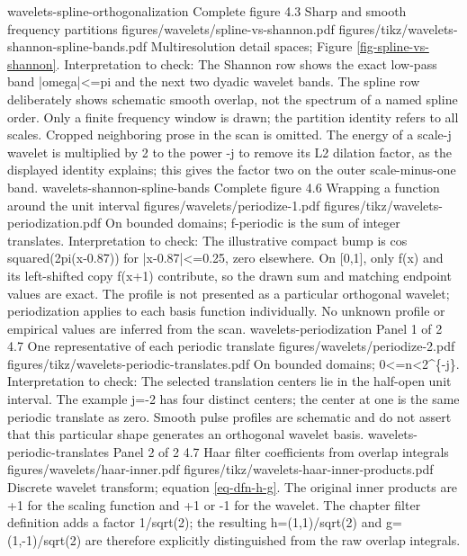 {wavelets-spline-orthogonalization}
{Complete figure}
{4.3}
{Sharp and smooth frequency partitions}
{figures/wavelets/spline-vs-shannon.pdf}
{figures/tikz/wavelets-shannon-spline-bands.pdf}
{Multiresolution detail spaces; Figure \ref{fig-spline-vs-shannon}.}
{Interpretation to check: The Shannon row shows the exact low-pass band |omega|<=pi and the next two dyadic wavelet bands. The spline row deliberately shows schematic smooth overlap, not the spectrum of a named spline order. Only a finite frequency window is drawn; the partition identity refers to all scales. Cropped neighboring prose in the scan is omitted. The energy of a scale-j wavelet is multiplied by 2 to the power -j to remove its L2 dilation factor, as the displayed identity explains; this gives the factor two on the outer scale-minus-one band.}
{wavelets-shannon-spline-bands}
{Complete figure}
{4.6}
{Wrapping a function around the unit interval}
{figures/wavelets/periodize-1.pdf}
{figures/tikz/wavelets-periodization.pdf}
{On bounded domains; f-periodic is the sum of integer translates.}
{Interpretation to check: The illustrative compact bump is cos squared(2pi(x-0.87)) for |x-0.87|<=0.25, zero elsewhere. On [0,1], only f(x) and its left-shifted copy f(x+1) contribute, so the drawn sum and matching endpoint values are exact. The profile is not presented as a particular orthogonal wavelet; periodization applies to each basis function individually. No unknown profile or empirical values are inferred from the scan.}
{wavelets-periodization}
{Panel 1 of 2}
{4.7}
{One representative of each periodic translate}
{figures/wavelets/periodize-2.pdf}
{figures/tikz/wavelets-periodic-translates.pdf}
{On bounded domains; 0<=n<2\textasciicircum{}\{-j\}.}
{Interpretation to check: The selected translation centers lie in the half-open unit interval. The example j=-2 has four distinct centers; the center at one is the same periodic translate as zero. Smooth pulse profiles are schematic and do not assert that this particular shape generates an orthogonal wavelet basis.}
{wavelets-periodic-translates}
{Panel 2 of 2}
{4.7}
{Haar filter coefficients from overlap integrals}
{figures/wavelets/haar-inner.pdf}
{figures/tikz/wavelets-haar-inner-products.pdf}
{Discrete wavelet transform; equation \eqref{eq-dfn-h-g}.}
{The original inner products are +1 for the scaling function and +1 or -1 for the wavelet. The chapter filter definition adds a factor 1/sqrt(2); the resulting h=(1,1)/sqrt(2) and g=(1,-1)/sqrt(2) are therefore explicitly distinguished from the raw overlap integrals.}
